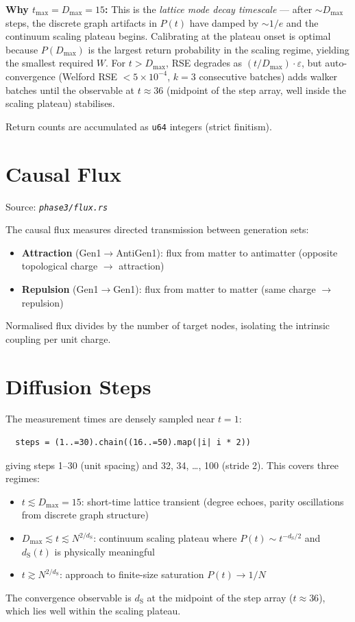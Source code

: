 \documentclass[11pt, a4paper, openany]{book}
\newcommand{\dS}{d_{\mathrm{S}}}
\newcommand{\code}[1]{\texttt{#1}}
\newcommand{\file}[1]{\texttt{\itshape #1}}
\begin{document}
\textbf{Why $t_{\max} = D_{\max} = 15$:} This is the \emph{lattice mode decay
timescale} --- after $\sim D_{\max}$ steps, the discrete graph artifacts in
$P(t)$ have damped by $\sim 1/e$ and the continuum scaling plateau begins.
Calibrating at the plateau onset is optimal because $P(D_{\max})$ is the
largest return probability in the scaling regime, yielding the smallest required
$W$.  For $t > D_{\max}$, RSE degrades as $(t/D_{\max})\cdot\varepsilon$, but
auto-convergence (Welford RSE $< 5\times 10^{-4}$, $k = 3$ consecutive batches)
adds walker batches until the observable at $t \approx 36$ (midpoint of the step
array, well inside the scaling plateau) stabilises.

Return counts are accumulated as \code{u64} integers (strict finitism).

\section{Causal Flux}

Source: \file{phase3/flux.rs}

The causal flux measures directed transmission between generation sets:
\begin{itemize}
  \item \textbf{Attraction} (Gen1$\to$AntiGen1): flux from matter to antimatter
        (opposite topological charge $\to$ attraction)
  \item \textbf{Repulsion} (Gen1$\to$Gen1): flux from matter to matter
        (same charge $\to$ repulsion)
\end{itemize}
Normalised flux divides by the number of target nodes, isolating the intrinsic
coupling per unit charge.

\section{Diffusion Steps}

The measurement times are densely sampled near $t = 1$:
\begin{verbatim}
  steps = (1..=30).chain((16..=50).map(|i| i * 2))
\end{verbatim}
giving steps 1--30 (unit spacing) and 32, 34, \ldots, 100 (stride 2).  This
covers three regimes:
\begin{itemize}
  \item $t \lesssim D_{\max} = 15$: short-time lattice transient (degree echoes,
        parity oscillations from discrete graph structure)
  \item $D_{\max} \lesssim t \lesssim N^{2/\dS}$: continuum scaling plateau
        where $P(t) \sim t^{-\dS/2}$ and $\dS(t)$ is physically meaningful
  \item $t \gtrsim N^{2/\dS}$: approach to finite-size saturation $P(t) \to 1/N$
\end{itemize}
The convergence observable is $\dS$ at the midpoint of the step array
($t \approx 36$), which lies well within the scaling plateau.
\end{document}
